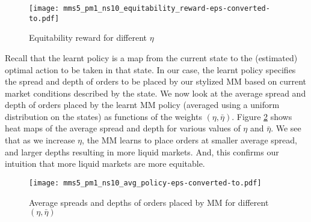 \documentclass[sigconf]{acmart}
\begin{document}
\begin{figure}
    \centering
    \texttt{[image: mms5\_pm1\_ns10\_equitability\_reward-eps-converted-to.pdf]}
    \caption{Equitability reward for different $\eta$}
    \label{fig:r_fair}
\end{figure}

Recall that the learnt policy is a map from the current state to the (estimated) optimal action to be taken in that state. In our case, the learnt policy specifies the spread and depth of orders to be placed by our stylized MM based on current market conditions described by the state. We now look at the average spread and depth of orders placed by the learnt MM policy (averaged using a uniform distribution on the states) as functions of the weights $(\eta,\bar\eta)$. Figure \ref{fig:avg_s_d} shows heat maps of the average spread and depth for various values of $\eta$ and $\bar\eta$. We see that as we increase $\eta$, the MM learns to place orders at smaller average spread, and larger depths resulting in more liquid markets. And, this confirms our intuition that more liquid markets are more equitable.
\begin{figure}
    \centering
    \texttt{[image: mms5\_pm1\_ns10\_avg\_policy-eps-converted-to.pdf]}
    \caption{Average spreads and depths of orders placed by MM for different $(\eta,\bar\eta)$}
    \label{fig:avg_s_d}
\end{figure}
\end{document}
